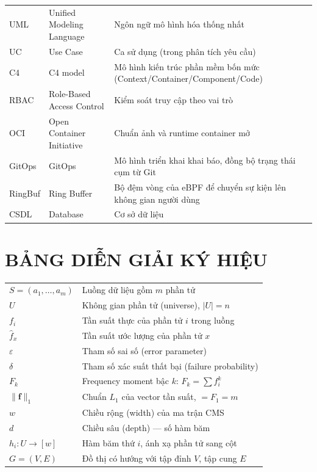 \begin{longtable}{@{}p{3.5cm} >{\raggedright\arraybackslash}p{6cm} >{\raggedright\arraybackslash}p{5cm}@{}}
UML     & Unified Modeling Language & Ngôn ngữ mô hình hóa thống nhất \\
UC      & Use Case & Ca sử dụng (trong phân tích yêu cầu) \\
C4      & C4 model & Mô hình kiến trúc phần mềm bốn mức (Context/Container/Component/Code) \\
RBAC    & Role-Based Access Control & Kiểm soát truy cập theo vai trò \\
OCI     & Open Container Initiative & Chuẩn ảnh và runtime container mở \\
GitOps  & GitOps & Mô hình triển khai khai báo, đồng bộ trạng thái cụm từ Git \\
RingBuf & Ring Buffer & Bộ đệm vòng của eBPF để chuyển sự kiện lên không gian người dùng \\
CSDL    & Database & Cơ sở dữ liệu \\

\end{longtable}

\clearpage


\chapter*{BẢNG DIỄN GIẢI KÝ HIỆU}

\begin{longtable}{@{}p{3.5cm} p{10cm}@{}}

$S = (a_1, \ldots, a_m)$ & Luồng dữ liệu gồm $m$ phần tử \\
$U$                      & Không gian phần tử (universe), $|U| = n$ \\
$f_i$                    & Tần suất thực của phần tử $i$ trong luồng \\
$\hat{f}_x$              & Tần suất ước lượng của phần tử $x$ \\
$\varepsilon$            & Tham số sai số (error parameter) \\
$\delta$                 & Tham số xác suất thất bại (failure probability) \\
$F_k$                    & Frequency moment bậc $k$: $F_k = \sum f_i^k$ \\
$\|\mathbf{f}\|_1$       & Chuẩn $L_1$ của vector tần suất, $= F_1 = m$ \\
$w$                      & Chiều rộng (width) của ma trận CMS \\
$d$                      & Chiều sâu (depth) — số hàm băm \\
$h_i: U \to [w]$         & Hàm băm thứ $i$, ánh xạ phần tử sang cột \\
$G = (V, E)$             & Đồ thị có hướng với tập đỉnh $V$, tập cung $E$ \\

\end{longtable}


